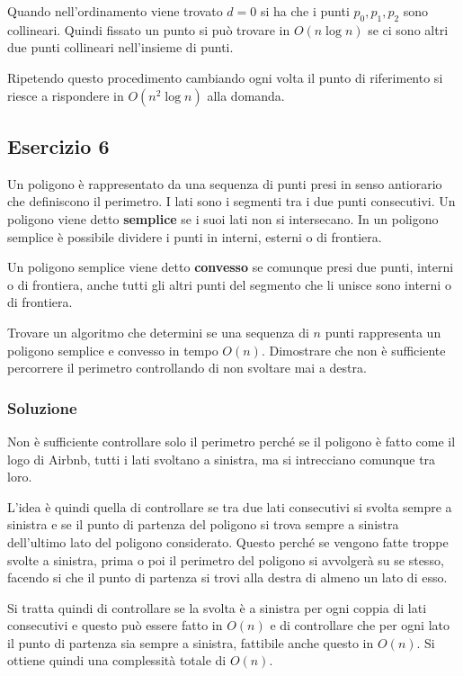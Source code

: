 Quando nell'ordinamento viene trovato $d = 0$ si ha che i punti $p_0, p_1, p_2$ sono collineari. Quindi fissato un punto si può trovare in $O(n \log n)$ se ci sono altri due punti collineari nell'insieme di punti.

Ripetendo questo procedimento cambiando ogni volta il punto di riferimento si riesce a rispondere in $O(n^2 \log n)$ alla domanda.

\subsection{Esercizio 6}\label{esercizio-6}

Un poligono è rappresentato da una sequenza di punti presi in senso antiorario che definiscono il perimetro. I lati sono i segmenti tra i due punti consecutivi. Un poligono viene detto \textbf{semplice} se i suoi lati non si intersecano.
In un poligono semplice è possibile dividere i punti in interni, esterni o di frontiera.

Un poligono semplice viene detto \textbf{convesso} se comunque presi due punti, interni o di frontiera, anche tutti gli altri punti del segmento che li unisce sono interni o di frontiera.

Trovare un algoritmo che determini se una sequenza di $n$ punti rappresenta un poligono semplice e convesso in tempo $O(n)$. Dimostrare che non è sufficiente percorrere il perimetro controllando di non svoltare mai a destra.

\subsubsection{Soluzione}

Non è sufficiente controllare solo il perimetro perché se il poligono è fatto come il logo di Airbnb, tutti i lati svoltano a sinistra, ma si intrecciano comunque tra loro.

L'idea è quindi quella di controllare se tra due lati consecutivi si svolta sempre a sinistra e se il punto di partenza del poligono si trova sempre a sinistra dell'ultimo lato del poligono considerato. Questo perché se vengono fatte troppe svolte a sinistra, prima o poi il perimetro del poligono si avvolgerà su se stesso, facendo si che il punto di partenza si trovi alla destra di almeno un lato di esso.

Si tratta quindi di controllare se la svolta è a sinistra per ogni coppia di lati consecutivi e questo può essere fatto in $O(n)$ e di controllare che per ogni lato il punto di partenza sia sempre a sinistra, fattibile anche questo in $O(n)$.
Si ottiene quindi una complessità totale di $O(n)$.

